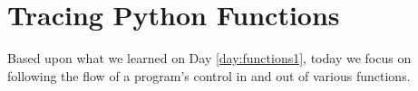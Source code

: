 
\chapter{Tracing Python Functions}
\label{day:tracing-functions}


\minitoc

Based upon what we learned on Day \ref{day:functions1}, today we focus on following the flow of a program's control in and out of various functions.
